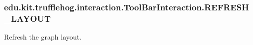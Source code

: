 \subsubsection[{R\+E\+F\+R\+E\+S\+H\+\_\+\+L\+A\+Y\+O\+U\+T}]{\setlength{\rightskip}{0pt plus 5cm}edu.\+kit.\+trufflehog.\+interaction.\+Tool\+Bar\+Interaction.\+R\+E\+F\+R\+E\+S\+H\+\_\+\+L\+A\+Y\+O\+U\+T}\label{enumedu_1_1kit_1_1trufflehog_1_1interaction_1_1_tool_bar_interaction_a1fb519929d89408c9cb7283c230f0184}
Refresh the graph layout. 